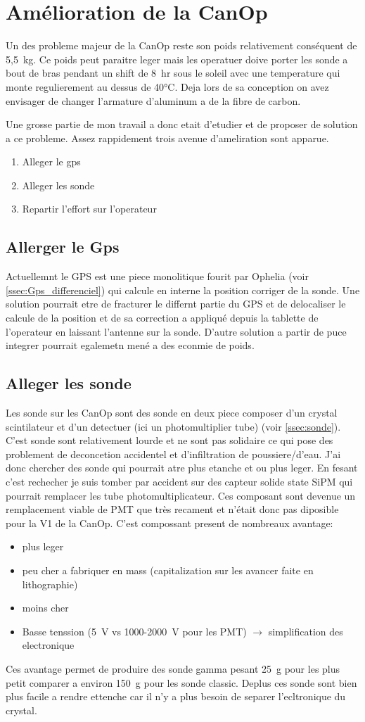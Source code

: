 \section{Amélioration de la CanOp}

Un des probleme majeur de la CanOp reste son poids relativement conséquent de 5,5~kg. Ce poids peut paraitre leger mais les operatuer doive porter les sonde a bout de bras pendant un shift de 8~hr sous le soleil avec une temperature qui monte regulierement au dessus de 40°C. Deja lors de sa conception on avez envisager de changer l'armature d'aluminum a de la fibre de carbon. 

Une grosse partie de mon travail a donc etait d'etudier et de proposer de solution a ce probleme. Assez rappidement trois avenue d'ameliration sont apparue.
\begin{enumerate}
    \item Alleger le gps 
    \item Alleger les sonde
    \item Repartir l'effort sur l'operateur
\end{enumerate}

\subsection{Allerger le Gps}
Actuellemnt le GPS est une piece monolitique fourit par Ophelia (voir \cref{ssec:Gps_differenciel}) qui calcule en interne la position corriger de la sonde. Une solution pourrait etre de fracturer le differnt partie du GPS et de delocaliser le calcule de la position et de sa correction a appliqué depuis la tablette de l'operateur en laissant l'antenne sur la sonde. D'autre solution a partir de puce integrer pourrait egalemetn mené a des econmie de poids.

\subsection{Alleger les sonde}
Les sonde sur les CanOp sont des sonde en deux piece composer d'un crystal scintilateur et d'un detectuer (ici un photomultiplier tube) (voir \cref{ssec:sonde}). C'est sonde sont relativement lourde et ne sont pas solidaire ce qui pose des problement de deconcetion accidentel et d'infiltration de poussiere/d'eau. 
J'ai donc chercher des sonde qui pourrait atre plus etanche et ou plus leger. En fesant c'est rechecher je suis tomber par accident sur des capteur solide state SiPM qui pourrait remplacer les tube photomultiplicateur. Ces composant sont devenue un remplacement viable de PMT que très recament et n'était donc pas diposible pour la V1 de la CanOp. C'est compossant present de nombreaux avantage:
\begin{itemize}
    \item plus leger
    \item peu cher a fabriquer en mass (capitalization sur les avancer faite en lithographie)
    \item moins cher
    \item Basse tenssion (5~V vs 1000-2000~V pour les PMT) $\rightarrow$ simplification des electronique
\end{itemize}

Ces avantage permet de produire des sonde gamma pesant 25~g\cite{} pour les plus petit comparer a environ 150~g\cite{} pour les sonde classic. Deplus ces sonde sont bien plus facile a rendre ettenche car il n'y a plus besoin de separer l'ecltronique du crystal.
